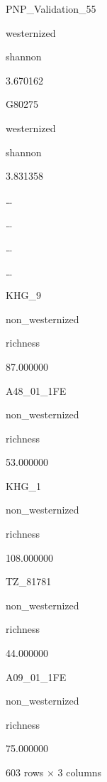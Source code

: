 \documentclass[
  letterpaper,
]{book}
\begin{document}
PNP\_Validation\_55

westernized

shannon

3.670162

G80275

westernized

shannon

3.831358

\ldots{}

\ldots{}

\ldots{}

\ldots{}

KHG\_9

non\_westernized

richness

87.000000

A48\_01\_1FE

non\_westernized

richness

53.000000

KHG\_1

non\_westernized

richness

108.000000

TZ\_81781

non\_westernized

richness

44.000000

A09\_01\_1FE

non\_westernized

richness

75.000000

603 rows × 3 columns
\end{document}
